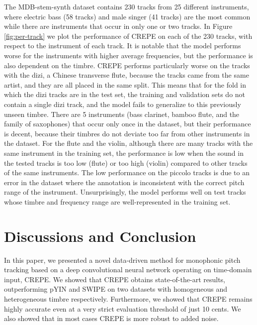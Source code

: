 The MDB-stem-synth dataset contains 230 tracks from 25 different instruments, where electric bass (58 tracks) and male singer (41 tracks) are the most common while there are instruments that occur in only one or two tracks.
In Figure \ref{fig:per-track} we plot the performance of CREPE on each of the 230 tracks, with respect to the instrument of each track.
It is notable that the model performs worse for the instruments with higher average frequencies, but the performance is also dependent on the timbre.
CREPE performs particularly worse on the tracks with the dizi, a Chinese transverse flute, because the tracks came from the same artist, and they are all placed in the same split.
This means that for the fold in which the dizi tracks are in the test set, the training and validation sets do not contain a single dizi track, and the model fails to generalize to this previously unseen timbre.
There are 5 instruments (bass clarinet, bamboo flute, and the family of saxophones) that occur only once in the dataset, but their performance is decent, because their timbres do not deviate too far from other instruments in the dataset.
For the flute and the violin, although there are many tracks with the same instrument in the training set, the performance is low when the sound in the tested tracks is too low (flute) or too high (violin) compared to other tracks of the same instruments.
The low performance on the piccolo tracks is due to an error in the dataset where the annotation is inconsistent with the correct pitch range of the instrument.
Unsurprisingly, the model performs well on test tracks whose timbre and frequency range are well-represented in the training set.

\section{Discussions and Conclusion}

In this paper, we presented a novel data-driven method for monophonic pitch tracking based on a deep convolutional neural network operating on time-domain input, CREPE.
We showed that CREPE obtains state-of-the-art results, outperforming pYIN and SWIPE on two datasets with homogeneous and heterogeneous timbre respectively.
Furthermore, we showed that CREPE remains highly accurate even at a very strict evaluation threshold of just 10 cents.
We also showed that in most cases CREPE is more robust to added noise.


